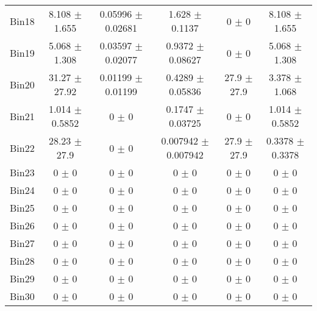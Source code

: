 \begin{tabular}{@{\extracolsep{4pt}}lccccc@{}}
     Bin18 & 8.108 $\pm$ 1.655 & 0.05996 $\pm$ 0.02681 & 1.628 $\pm$ 0.1137 & 0 $\pm$ 0 & 8.108 $\pm$ 1.655 \\ 
     Bin19 & 5.068 $\pm$ 1.308 & 0.03597 $\pm$ 0.02077 & 0.9372 $\pm$ 0.08627 & 0 $\pm$ 0 & 5.068 $\pm$ 1.308 \\ 
     Bin20 & 31.27 $\pm$ 27.92 & 0.01199 $\pm$ 0.01199 & 0.4289 $\pm$ 0.05836 & 27.9 $\pm$ 27.9 & 3.378 $\pm$ 1.068 \\ 
     Bin21 & 1.014 $\pm$ 0.5852 & 0 $\pm$ 0 & 0.1747 $\pm$ 0.03725 & 0 $\pm$ 0 & 1.014 $\pm$ 0.5852 \\ 
     Bin22 & 28.23 $\pm$ 27.9 & 0 $\pm$ 0 & 0.007942 $\pm$ 0.007942 & 27.9 $\pm$ 27.9 & 0.3378 $\pm$ 0.3378 \\ 
     Bin23 & 0 $\pm$ 0 & 0 $\pm$ 0 & 0 $\pm$ 0 & 0 $\pm$ 0 & 0 $\pm$ 0 \\ 
     Bin24 & 0 $\pm$ 0 & 0 $\pm$ 0 & 0 $\pm$ 0 & 0 $\pm$ 0 & 0 $\pm$ 0 \\ 
     Bin25 & 0 $\pm$ 0 & 0 $\pm$ 0 & 0 $\pm$ 0 & 0 $\pm$ 0 & 0 $\pm$ 0 \\ 
     Bin26 & 0 $\pm$ 0 & 0 $\pm$ 0 & 0 $\pm$ 0 & 0 $\pm$ 0 & 0 $\pm$ 0 \\ 
     Bin27 & 0 $\pm$ 0 & 0 $\pm$ 0 & 0 $\pm$ 0 & 0 $\pm$ 0 & 0 $\pm$ 0 \\ 
     Bin28 & 0 $\pm$ 0 & 0 $\pm$ 0 & 0 $\pm$ 0 & 0 $\pm$ 0 & 0 $\pm$ 0 \\ 
     Bin29 & 0 $\pm$ 0 & 0 $\pm$ 0 & 0 $\pm$ 0 & 0 $\pm$ 0 & 0 $\pm$ 0 \\ 
     Bin30 & 0 $\pm$ 0 & 0 $\pm$ 0 & 0 $\pm$ 0 & 0 $\pm$ 0 & 0 $\pm$ 0 \\ 
\hline\hline
  \end{tabular}
